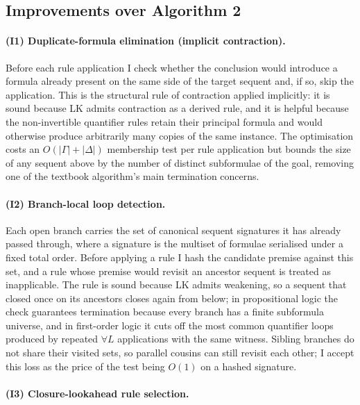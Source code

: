 \documentclass[runningheads]{llncs}
\begin{document}
\subsection{Improvements over Algorithm 2}
\label{sec:improvements}


\paragraph{(I1) Duplicate-formula elimination (implicit contraction).}

Before each rule application I check whether the conclusion would
introduce a formula already present on the same side of the target
sequent and, if so, skip the application. This is the structural rule
of contraction applied implicitly: it is sound because LK admits
contraction as a derived rule, and it is helpful because the
non-invertible quantifier rules retain their principal formula and would
otherwise produce arbitrarily many copies of the same instance. The
optimisation costs an $O(|\Gamma|+|\Delta|)$ membership test per rule
application but bounds the size of any sequent above by the number of
distinct subformulae of the goal, removing one of the textbook
algorithm's main termination concerns.

\paragraph{(I2) Branch-local loop detection.}

Each open branch carries the set of canonical sequent signatures it has
already passed through, where a signature is the multiset of formulae
serialised under a fixed total order. Before applying a rule I hash the
candidate premise against this set, and a rule whose premise would
revisit an ancestor sequent is treated as inapplicable. The rule is
sound because LK admits weakening, so a sequent that closed once on its
ancestors closes again from below; in propositional logic the check
guarantees termination because every branch has a finite subformula
universe, and in first-order logic it cuts off the most common
quantifier loops produced by repeated $\forall L$ applications with the
same witness. Sibling branches do not share their visited sets, so
parallel cousins can still revisit each other; I accept this loss as
the price of the test being $O(1)$ on a hashed signature.

\paragraph{(I3) Closure-lookahead rule selection.}
\end{document}
